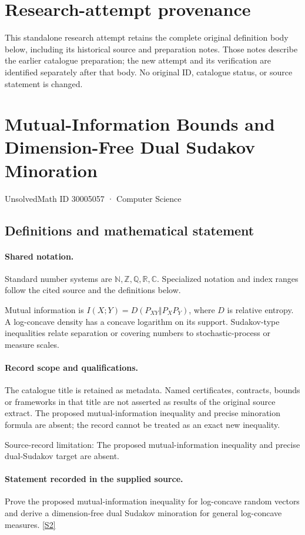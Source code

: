 \documentclass[11pt]{article}
\begin{document}
\section*{Research-attempt provenance}
This standalone research attempt retains the complete original definition body below,
including its historical source and preparation notes. Those notes describe the
earlier catalogue preparation; the new attempt and its verification are identified
separately after that body. No original ID, catalogue status, or source statement is changed.

\section{Mutual-Information Bounds and Dimension-Free Dual Sudakov Minoration}\label{30005057}
{\small UnsolvedMath ID 30005057 · Computer Science}
\subsection{Definitions and mathematical statement}

\paragraph{Shared notation.}Standard number systems are $\mathbb N,\mathbb Z,\mathbb Q,\mathbb R,\mathbb C$. Specialized notation and index ranges follow the cited source and the definitions below.


Mutual information is $I(X;Y)=D(P_{XY}\Vert P_XP_Y)$, where $D$ is relative entropy. A log-concave density has a concave logarithm on its support. Sudakov-type inequalities relate separation or covering numbers to stochastic-process or measure scales.
\paragraph{Record scope and qualifications.}
The catalogue title is retained as metadata. Named certificates, contracts, bounds or frameworks in that title are not asserted as results of the original source extract.
The proposed mutual-information inequality and precise minoration formula are absent; the record cannot be treated as an exact new inequality.

Source-record limitation: The proposed mutual-information inequality and precise dual-Sudakov target are absent.
\paragraph{Statement recorded in the supplied source.}
Prove the proposed mutual-information inequality for log-concave random vectors and derive a dimension-free dual Sudakov minoration for general log-concave measures. \href{https://doi.org/10.4171/owr/2022/14}{[S2]}
\end{document}
